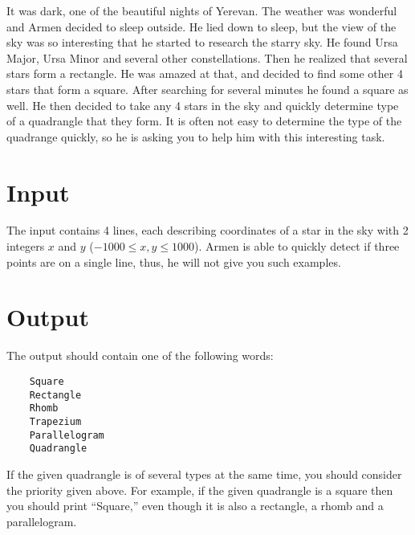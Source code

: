 
It was dark, one of the beautiful nights of Yerevan.
The weather was wonderful and Armen decided to sleep outside.
He lied down to sleep, but the view of the sky was so interesting that he started to research the starry sky.
He found Ursa Major, Ursa Minor and several other constellations.
Then he realized that several stars form a rectangle.
He was amazed at that, and decided to find some other 4 stars that form a square.
After searching for several minutes he found a square as well.
He then decided to take any 4 stars in the sky and quickly determine type of a quadrangle that they form.
It is often not easy to determine the type of the quadrange quickly, so he is asking you to help him with this interesting task.

\section*{Input}
The input contains 4 lines, each describing coordinates of a star in the sky with 2 integers $x$ and $y$ ($-1000 \leq x, y \leq 1000$).
Armen is able to quickly detect if three points are on a single line, thus, he will not give you such examples. 

\section*{Output}
The output should contain one of the following words:
\begin{verbatim}
    Square
    Rectangle
    Rhomb
    Trapezium
    Parallelogram
    Quadrangle
\end{verbatim}
If the given quadrangle is of several types at the same time, you should consider the priority given above.
For example, if the given quadrangle is a square then you should print ``Square,'' even though it is also a rectangle, a rhomb and a parallelogram.
